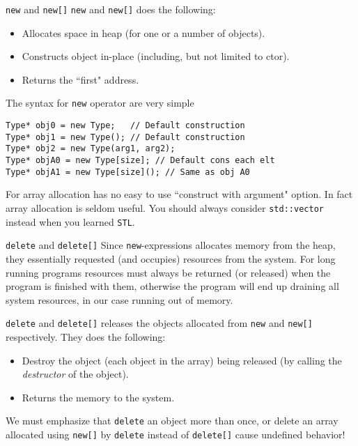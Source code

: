 \begin{frame}[fragile]{\texttt{new} and \texttt{new[]}}
\texttt{new} and \texttt{new[]} does the following:
\begin{itemize}
\item Allocates space in heap (for one or a number of objects). 
\item Constructs object in-place (including, but not limited to ctor). 
\item Returns the ``first" address.
\end{itemize}
The syntax for \texttt{new} operator are very simple 
\begin{verbatim}
Type* obj0 = new Type;   // Default construction
Type* obj1 = new Type(); // Default construction
Type* obj2 = new Type(arg1, arg2); 
Type* objA0 = new Type[size]; // Default cons each elt
Type* objA1 = new Type[size](); // Same as obj A0
\end{verbatim}
For array allocation has no easy to use ``construct with argument" option. In fact array allocation is seldom useful. You should always consider \texttt{std::vector} instead when you learned \texttt{STL}.
\end{frame}

\begin{frame}[fragile]{\texttt{delete} and \texttt{delete[]}}
Since \texttt{new}-expressions allocates memory from the heap, they essentially requested (and occupies) resources from the system. For long running programs resources must always be returned (or released) when the program is finished with them, otherwise the program will end up draining all system resources, in our case running out of memory. 

\texttt{delete} and \texttt{delete[]} releases the objects allocated from \texttt{new} and \texttt{new[]} \alert{respectively}. They does the following:
\begin{itemize}
\item Destroy the object (each object in the array) being released (by calling the \textit{destructor} of the object).
\item Returns the memory to the system.
\end{itemize}
We must emphasize that \alert{\texttt{delete} an object more than once, or delete an array allocated using \texttt{new[]} by \texttt{delete} instead of \texttt{delete[]} cause undefined behavior!}
\end{frame}

